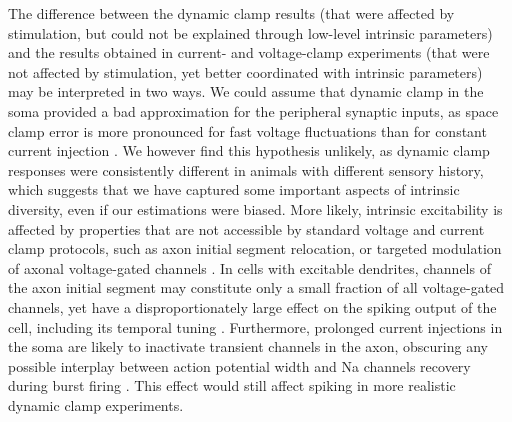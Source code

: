 \documentclass{article}
\begin{document}
The difference between the dynamic clamp results (that were affected by stimulation, but could not be explained through low-level intrinsic parameters) and the results obtained in current- and voltage-clamp experiments (that were not affected by stimulation, yet better coordinated with intrinsic parameters) may be interpreted in two ways. We could assume that dynamic clamp in the soma provided a bad approximation for the peripheral synaptic inputs, as space clamp error is more pronounced for fast voltage fluctuations than for constant current injection \citep{spruston1993,prinz2004}. We however find this hypothesis unlikely, as dynamic clamp responses were consistently different in animals with different sensory history, which suggests that we have captured some important aspects of intrinsic diversity, even if our estimations were biased. More likely, intrinsic excitability is affected by properties that are not accessible by standard voltage and current clamp protocols, such as axon initial segment relocation, or targeted modulation of axonal voltage-gated channels \citep{grubb2010,kole2012}. In cells with excitable dendrites, channels of the axon initial segment may constitute only a small fraction of all voltage-gated channels, yet have a disproportionately large effect on the spiking output of the cell, including its temporal tuning \citep{kole2007,hamada2016}. Furthermore, prolonged current injections in the soma are likely to inactivate transient channels in the axon, obscuring any possible interplay between action potential width and Na channels recovery during burst firing \citep{popovic2011,kole2012}. This effect would still affect spiking in more realistic dynamic clamp experiments.


\end{document}
